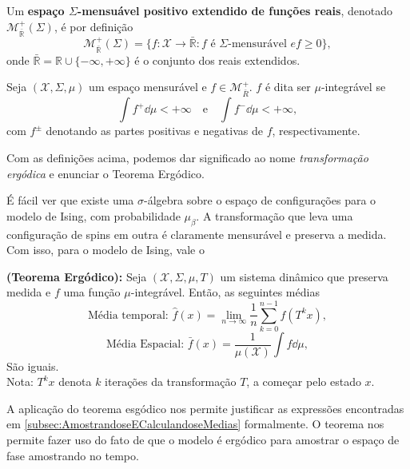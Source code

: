 \begin{definition}
	Um \textbf{espaço $\Sigma$-mensuável positivo extendido de funções reais}, denotado $\mathcal{M}^+_{\bar{\mathbb{R}}}(\Sigma)$, é por definição
	\begin{equation*}
		\mathcal{M}^+_{\bar{\mathbb{R}}}(\Sigma) = \{f \colon \mathcal{X}	 \to \bar{\mathbb{R}} \colon f \text{ é $\Sigma$-mensurável } e f \geq 0\},
	\end{equation*}
	onde $\bar{\mathbb{R}} = \mathbb{R} \cup \{ - \infty, + \infty \}$ é o conjunto dos reais extendidos. 
\end{definition}


\begin{definition}
	Seja $(\mathcal{X}, \Sigma, \mu)$ um espaço mensurável e $f \in \mathcal{M}^+_{\bar{R}}$. $f$ é dita ser $\mu$-integrável se
	\begin{equation*}
		\int f^+ \dd{\mu} < +\infty \quad \text{e} \quad \int f^- \dd{\mu} < +\infty,
	\end{equation*}
	com $f^\pm$ denotando as partes positivas e negativas de $f$, respectivamente. 
\end{definition}


Com as definições acima, podemos dar significado ao nome \textit{transformação ergódica} e enunciar o Teorema Ergódico.


É fácil ver que existe uma $\sigma$-álgebra sobre o espaço de configurações para o modelo de Ising, com probabilidade $\mu_\beta$. A transformação que leva uma configuração de spins em outra é claramente mensurável e preserva a medida. Com isso, para o modelo de Ising, vale o
\begin{theorem}
	\textbf{(Teorema Ergódico): } Seja $(\mathcal{X}, \Sigma, \mu, T)$ um sistema dinâmico que preserva medida e $f$ uma função $\mu$-integrável. Então, as seguintes médias
	\begin{equation*}
		\text{Média temporal: } \hat{f}(x) = \lim_{n \to \infty} \frac{1}{n} \sum_{k=0}^{n-1} f(T^k x),
	\end{equation*}	 
	\begin{equation*}
		\text{Média Espacial: }  \bar{f}(x) = \frac{1}{\mu(\mathcal{X})} \int  f \dd{\mu},
	\end{equation*}
	São iguais. \\
	Nota: $T^k x$ denota $k$ iterações da transformação $T$, a começar pelo estado $x$.
	\label{thm:1}
\end{theorem}

A aplicação do teorema esgódico nos permite justificar as expressões encontradas em \ref{subsec:AmostrandoseECalculandoseMedias} formalmente. O teorema nos permite fazer uso do fato de que o modelo é ergódico para amostrar o espaço de fase amostrando no tempo.


